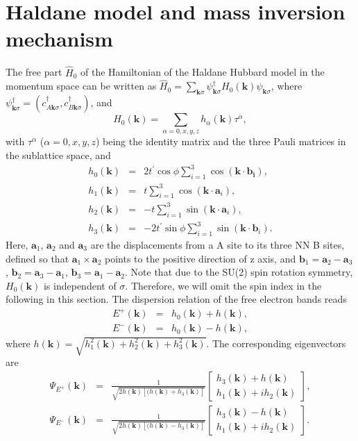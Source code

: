 \documentclass[amsmath,superscriptaddress,showpacs,aps,prl,twocolumn]{revtex4-1}
\begin{document}
\section{Haldane model and mass inversion mechanism}
\par The free part $\hat{H}_0$ of the Hamiltonian of the Haldane Hubbard model in the momentum space can be written as $\hat{H}_0=\sum_{\mathbf{k}\sigma}\psi^{\dagger}_{\mathbf{k}\sigma}H_0(\mathbf{k})\psi_{\mathbf{k}\sigma}$, where $\psi^{\dagger}_{\mathbf{k}\sigma}=(c^{\dagger}_{A\mathbf{k}\sigma},c^{\dagger}_{B\mathbf{k}\sigma})$, and
\begin{equation}\label{H0k}
H_0(\mathbf{k})=\sum_{\alpha=0,x,y,z}h_\alpha(\mathbf{k})\tau^\alpha,
\end{equation}
with $\tau^\alpha$ ($\alpha=0,x,y,z$) being the identity matrix and the three Pauli matrices in the sublattice space, and
\begin{eqnarray*}
h_0(\mathbf{k})&=&2t^\prime\cos\phi\sum_{i=1}^3\cos(\mathbf{k}\cdot\mathbf{b_i}), \\
h_1(\mathbf{k})&=&t\sum_{i=1}^3\cos(\mathbf{k}\cdot\mathbf{a}_i), \\
h_2(\mathbf{k})&=&-t\sum_{i=1}^3\sin(\mathbf{k}\cdot\mathbf{a}_i), \\
h_3(\mathbf{k})&=&-2t^\prime\sin\phi\sum_{i=1}^3\sin(\mathbf{k}\cdot\mathbf{b}_i).
\end{eqnarray*}
Here, $\mathbf{a}_1$, $\mathbf{a}_2$ and $\mathbf{a}_3$ are the displacements from a A site to its three NN B sites, defined so that $\mathbf{a}_1\times\mathbf{a}_2$ points to the positive direction of z axis, and $\mathbf{b}_1=\mathbf{a}_2-\mathbf{a}_3$, $\mathbf{b}_2=\mathbf{a}_3-\mathbf{a}_1$, $\mathbf{b}_3=\mathbf{a}_1-\mathbf{a}_2$. Note that due to the SU(2) spin rotation symmetry, $H_0(\mathbf{k})$ is independent of $\sigma$. Therefore, we will omit the spin index in the following in this section. The dispersion relation of the free electron bands reads
\begin{eqnarray*}
E^+(\mathbf{k})&=& h_0(\mathbf{k})+h(\mathbf{k}), \\
E^-(\mathbf{k})&=& h_0(\mathbf{k})-h(\mathbf{k}),
\end{eqnarray*}
where $h(\mathbf{k})=\sqrt{h^2_1(\mathbf{k})+h^2_2(\mathbf{k})+h^2_3(\mathbf{k})}$. The corresponding eigenvectors are
\begin{eqnarray}
\Psi_{E^+}(\mathbf{k})&=& \frac{1}{\sqrt{2h(\mathbf{k})\left[(h(\mathbf{k})+h_3(\mathbf{k})\right]}}
\begin{bmatrix}
h_3(\mathbf{k})+h(\mathbf{k}) \\
h_1(\mathbf{k})+ih_2(\mathbf{k})
\end{bmatrix},
\label{PsaiP}\\
\Psi_{E^-}(\mathbf{k})&=& \frac{1}{\sqrt{2h(\mathbf{k})\left[(h(\mathbf{k})-h_3(\mathbf{k})\right]}}
\begin{bmatrix}
h_3(\mathbf{k})-h(\mathbf{k})\\
h_1(\mathbf{k})+ih_2(\mathbf{k})
\end{bmatrix}\label{PsaiM}.
\end{eqnarray}
\end{document}
